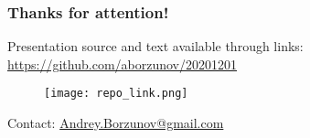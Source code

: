 \documentclass{beamer}
\begin{document}
\begin{frame}[c,allowframebreaks]
    
\end{frame}

\begin{frame}[c]
    \frametitle{Thanks for attention!}
    Presentation source and text available through links:
    \url{https://github.com/aborzunov/20201201}
    \begin{figure}
        \texttt{[image: repo\_link.png]}
    \end{figure}
     Contact: \url{Andrey.Borzunov@gmail.com}
\end{frame}
\end{document}
